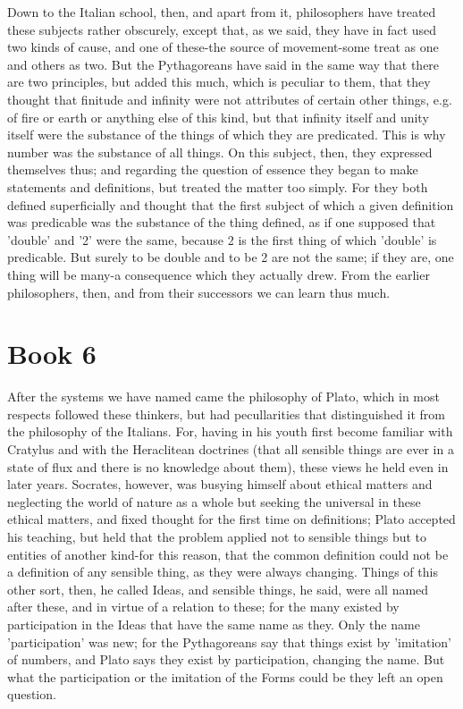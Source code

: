 \documentclass[oneside, 17pt, dvipsnames]{extbook}
\begin{document}
Down to the Italian school, then, and apart from it, philosophers have treated these subjects rather obscurely, except that, as we said, they have in fact used two kinds of cause, and one of these-the source of movement-some treat as one and others as two. But the Pythagoreans have said in the same way that there are two principles, but added this much, which is peculiar to them, that they thought that finitude and infinity were not attributes of certain other things, e.g. of fire or earth or anything else of this kind, but that infinity itself and unity itself were the substance of the things of which they are predicated. This is why number was the substance of all things. On this subject, then, they expressed themselves thus; and regarding the question of essence they began to make statements and definitions, but treated the matter too simply. For they both defined superficially and thought that the first subject of which a given definition was predicable was the substance of the thing defined, as if one supposed that 'double' and '2' were the same, because 2 is the first thing of which 'double' is predicable. But surely to be double and to be 2 are not the same; if they are, one thing will be many-a consequence which they actually drew. From the earlier philosophers, then, and from their successors we can learn thus much.





\newpage
\section{Book 6}

After the systems we have named came the philosophy of Plato, which in most respects followed these thinkers, but had pecullarities that distinguished it from the philosophy of the Italians. For, having in his youth first become familiar with Cratylus and with the Heraclitean doctrines (that all sensible things are ever in a state of flux and there is no knowledge about them), these views he held even in later years. Socrates, however, was busying himself about ethical matters and neglecting the world of nature as a whole but seeking the universal in these ethical matters, and fixed thought for the first time on definitions; Plato accepted his teaching, but held that the problem applied not to sensible things but to entities of another kind-for this reason, that the common definition could not be a definition of any sensible thing, as they were always changing. Things of this other sort, then, he called Ideas, and sensible things, he said, were all named after these, and in virtue of a relation to these; for the many existed by participation in the Ideas that have the same name as they. Only the name 'participation' was new; for the Pythagoreans say that things exist by 'imitation' of numbers, and Plato says they exist by participation, changing the name. But what the participation or the imitation of the Forms could be they left an open question.
\end{document}
